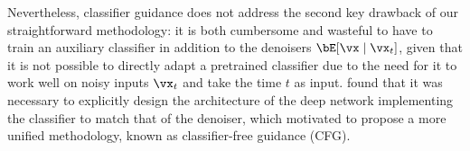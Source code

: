 \documentclass[../../book-main.tex]{subfiles}
\begin{document}

Nevertheless, classifier guidance does not address the second key drawback of
our straightforward methodology: it is both cumbersome and wasteful to have to
train an auxiliary classifier in addition to the denoisers $\bE[\vx \mid
\vx_t]$, given that it is not possible to directly adapt a pretrained classifier
due to the need for it to work well on noisy inputs $\vx_t$ and take the time
$t$ as input. \citet{Dhariwal2021-hg} found that it was necessary to explicitly
design the architecture of the deep network implementing the classifier to match
that of the denoiser, which motivated \citet{Ho2022-ry} to propose a more
unified methodology, known as classifier-free guidance (CFG). 


\begin{example}
\end{example}
\end{document}
